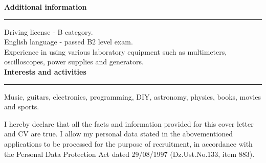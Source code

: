 \documentclass{article}
\newcommand{\header}[1] 
{
	\textbf{\large #1}
	\vspace{0.005\textheight}
	\hrule 
	\vspace{0.005\textheight}
}
\begin{document}
\header{Additional information}
Driving license - B category.\\
English language - passed B2 level exam.\\
Experience in using various laboratory equipment such as multimeters, oscilloscopes, power supplies and generators.\\
\header{Interests and activities}
Music, guitars, electronics, programming, DIY, astronomy, physics, books, movies and sports.
\vspace{0.05\textheight}
\noindent\newline
\scriptsize
\begin{minipage}{\textwidth}
	I hereby declare that all the facts and information provided for this cover letter and CV are true. I allow my personal data stated in the abovementioned applications to be processed for the purpose of recruitment, in accordance with the Personal Data Protection Act dated 29/08/1997 (Dz.Ust.No.133, item 883).
\end{minipage}
\end{document}

